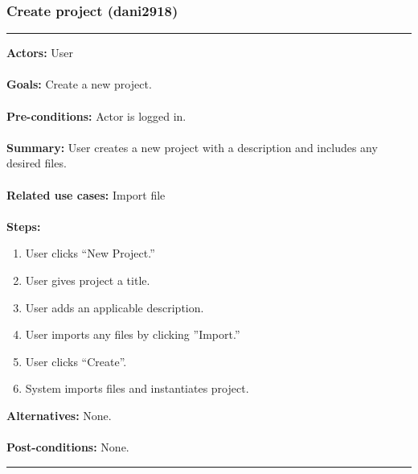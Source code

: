 \documentclass[11pt]{report}
\begin{document}
\subsubsection{Create project (dani2918)}
\vspace{2pt}
\hrule
\vspace{8pt}
 \textbf{Actors:} User \\ \\
\textbf{Goals:} Create a new project. \\ \\
 \textbf{Pre-conditions:} Actor is logged in.  \\ \\
\textbf{Summary:} User creates a new project with a description and includes any desired files. \\ \\
\textbf{Related use cases:} Import file \\ \\
\textbf{Steps:} \begin{enumerate}
  \item User clicks ``New Project.''
  \item User gives project a title.
  \item User adds an applicable description.
  \item User imports any files by clicking ''Import.''
  \item User clicks ``Create''.
  \item System imports files and instantiates project.
 \end{enumerate}
 \textbf{Alternatives:} None. \\ \\
 \textbf{Post-conditions:} None. \\
\vspace{8pt}
\hrule
\newpage
\end{document}
